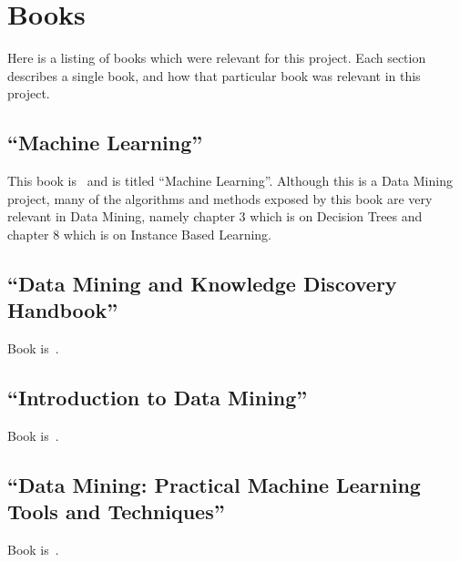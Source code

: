 \section{Books}

Here is a listing of books which were relevant for this project. Each section
describes a single book, and how that particular book was relevant in this
project.

\subsection{``Machine Learning''}

This book is~\cite{book_ml} and is titled ``Machine Learning''. Although this
is a Data Mining project, many of the algorithms and methods exposed by this
book are very relevant in Data Mining, namely chapter 3 which is on Decision
Trees and chapter 8 which is on Instance Based Learning.

\subsection{``Data Mining and Knowledge Discovery Handbook''}

Book is~\cite{book_dm_kdh}.~\TODO{}

\subsection{``Introduction to Data Mining''}

Book is~\cite{book_intro_dm}.~\TODO{}

\subsection{``Data Mining: Practical Machine Learning Tools and Techniques''}

Book is~\cite{book_dm_practical}.~\TODO{}

